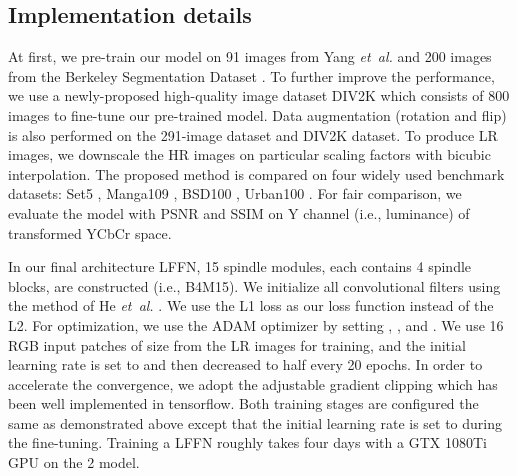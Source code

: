\documentclass[journal]{IEEEtran}
\begin{document}
\subsection{Implementation details}
At first, we pre-train our model on 91 images from Yang \emph{et~al.} \cite{yang2010image} and 200 images from the Berkeley Segmentation Dataset \cite{arbelaez2011contour}. To further improve the performance, we use a newly-proposed high-quality image dataset DIV2K \cite{agustsson2017ntire} which consists of 800 images to fine-tune our pre-trained model. Data augmentation (rotation and flip) is also performed on the 291-image dataset and DIV2K dataset. To produce LR images, we downscale the HR images on particular scaling factors with bicubic interpolation. The proposed method is compared on four widely used benchmark datasets: Set5 \cite{bevilacqua2012low}, Manga109 \cite{matsui2017sketch}, BSD100 \cite{martin2001database}, Urban100 \cite{huang2015single}. For fair comparison, we evaluate the model with PSNR and SSIM on Y channel (i.e., luminance) of transformed YCbCr space.
\par In our final architecture LFFN, 15 spindle modules, each contains 4 spindle blocks, are constructed (i.e., B4M15). We initialize all convolutional filters using the method of He \emph{et~al.} \cite{he2015delving}. We use the L1 loss as our loss function instead of the L2.  For optimization, we use the ADAM optimizer \cite{kingma2014adam} by setting , , and . We use 16 RGB input patches of size  from the LR images for training, and the initial learning rate is set to  and then decreased to half every 20 epochs. In order to accelerate the convergence, we adopt the adjustable gradient clipping \cite{Kim2016Accurate} which has been well implemented in tensorflow. Both training stages are configured the same as demonstrated above except that the initial learning rate is set to  during the fine-tuning. Training a LFFN roughly takes four days with a GTX 1080Ti GPU on the 2 model.
\end{document}
